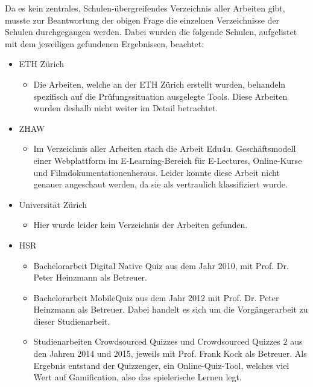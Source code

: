 \bigskip

Da es kein zentrales, Schulen-übergreifendes Verzeichnis aller Arbeiten gibt, musste zur Beantwortung der obigen Frage die einzelnen Verzeichnisse der Schulen durchgegangen werden. Dabei wurden die folgende Schulen, aufgelistet mit dem jeweiligen gefundenen Ergebnissen, beachtet:
\begin{itemize}
	\item ETH Zürich
	\begin{itemize}
		\item Die Arbeiten, welche an der ETH Zürich erstellt wurden, behandeln spezifisch auf die Prüfungssituation ausgelegte Tools. Diese Arbeiten wurden deshalb nicht weiter im Detail betrachtet. \cite{zeller_automated_2014} \cite{antonucci_autoteach_2014} \cite{heinrich_design_2008} \cite{nanzer_einsatz_2005}
	\end{itemize}
	\item ZHAW
	\begin{itemize}
		\item Im Verzeichnis aller Arbeiten stach die Arbeit \glqq Edu4u. Geschäftsmodell einer Webplattform im E-Learning-Bereich für E-Lectures, Online-Kurse und Filmdokumentationen\grqq heraus. Leider konnte diese Arbeit nicht genauer angeschaut werden, da sie als vertraulich klassifiziert wurde. \cite{_bachelorarbeiten-2013-zhaw-sml.pdf_}
	\end{itemize}
	\item Universität Zürich
	\begin{itemize}
		\item Hier wurde leider kein Verzeichnis der Arbeiten gefunden.
	\end{itemize}
	\item HSR
	\begin{itemize}
		\item Bachelorarbeit \glqq Digital Native Quiz\grqq \cite{grob_digital_2010} aus dem Jahr 2010, mit Prof. Dr. Peter Heinzmann als Betreuer.
		\item Bachelorarbeit \glqq MobileQuiz\grqq \cite{khalid_bachelorarbeit_mobile_quiz_juni_2012.pdf_2012} aus dem Jahr 2012 mit Prof. Dr. Peter Heinzmann als Betreuer. Dabei handelt es sich um die Vorgängerarbeit zu dieser Studienarbeit.
		\item Studienarbeiten \glqq Crowdsourced Quizzes\grqq \cite{_technischer_bericht-quizzenger_crowdsourced_quizzes.pdf_} und \glqq Crowdsourced Quizzes 2\grqq \cite{_technischer_bericht-quizzenger-2.pdf_} aus den Jahren 2014 und 2015, jeweils mit Prof. Frank Kock als Betreuer. Als Ergebnis entstand der Quizzenger, ein Online-Quiz-Tool, welches viel Wert auf Gamification, also das spielerische Lernen legt.
	\end{itemize}
\end{itemize}


